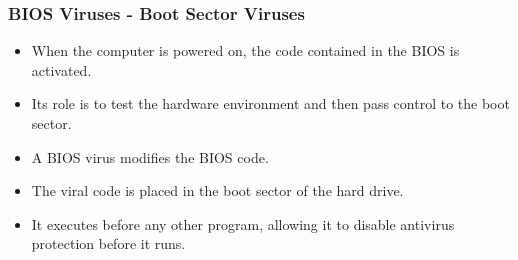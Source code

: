\documentclass{beamer}
\begin{document}







\begin{frame}
\frametitle{BIOS Viruses - Boot Sector Viruses}
\begin{itemize}
\item When the computer is powered on, the code contained in the BIOS is activated.
\item Its role is to test the hardware environment and then pass control to the boot sector.
\item A BIOS virus modifies the BIOS code.
\end{itemize}
\begin{itemize}
\item The viral code is placed in the boot sector of the hard drive.
  \item It executes before any other program, allowing it to disable antivirus protection before it runs.
  \end{itemize}
\end{frame}

\end{document}
